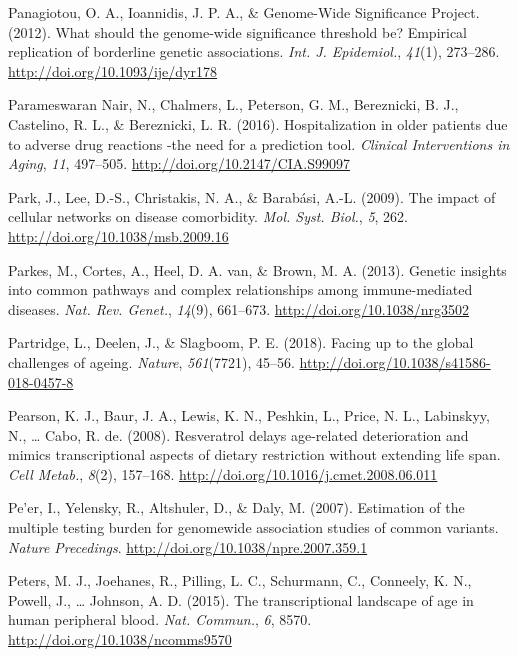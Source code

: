 \documentclass[12pt,twoside]{unicam}
\begin{document}
\begin{cslreferences}
\leavevmode\hypertarget{ref-Panagiotou2012}{}%
Panagiotou, O. A., Ioannidis, J. P. A., \& Genome-Wide Significance Project. (2012). What should the genome-wide significance threshold be? Empirical replication of borderline genetic associations. \emph{Int. J. Epidemiol.}, \emph{41}(1), 273--286. \url{http://doi.org/10.1093/ije/dyr178}

\leavevmode\hypertarget{ref-ParameswaranNair2016}{}%
Parameswaran Nair, N., Chalmers, L., Peterson, G. M., Bereznicki, B. J., Castelino, R. L., \& Bereznicki, L. R. (2016). Hospitalization in older patients due to adverse drug reactions -the need for a prediction tool. \emph{Clinical Interventions in Aging}, \emph{11}, 497--505. \url{http://doi.org/10.2147/CIA.S99097}

\leavevmode\hypertarget{ref-Park2009}{}%
Park, J., Lee, D.-S., Christakis, N. A., \& Barabási, A.-L. (2009). The impact of cellular networks on disease comorbidity. \emph{Mol. Syst. Biol.}, \emph{5}, 262. \url{http://doi.org/10.1038/msb.2009.16}

\leavevmode\hypertarget{ref-Parkes2013}{}%
Parkes, M., Cortes, A., Heel, D. A. van, \& Brown, M. A. (2013). Genetic insights into common pathways and complex relationships among immune-mediated diseases. \emph{Nat. Rev. Genet.}, \emph{14}(9), 661--673. \url{http://doi.org/10.1038/nrg3502}

\leavevmode\hypertarget{ref-Partridge2018}{}%
Partridge, L., Deelen, J., \& Slagboom, P. E. (2018). Facing up to the global challenges of ageing. \emph{Nature}, \emph{561}(7721), 45--56. \url{http://doi.org/10.1038/s41586-018-0457-8}

\leavevmode\hypertarget{ref-Pearson2008}{}%
Pearson, K. J., Baur, J. A., Lewis, K. N., Peshkin, L., Price, N. L., Labinskyy, N., \ldots{} Cabo, R. de. (2008). Resveratrol delays age-related deterioration and mimics transcriptional aspects of dietary restriction without extending life span. \emph{Cell Metab.}, \emph{8}(2), 157--168. \url{http://doi.org/10.1016/j.cmet.2008.06.011}

\leavevmode\hypertarget{ref-Peer2007}{}%
Pe'er, I., Yelensky, R., Altshuler, D., \& Daly, M. (2007). Estimation of the multiple testing burden for genomewide association studies of common variants. \emph{Nature Precedings}. \url{http://doi.org/10.1038/npre.2007.359.1}

\leavevmode\hypertarget{ref-Peters2015}{}%
Peters, M. J., Joehanes, R., Pilling, L. C., Schurmann, C., Conneely, K. N., Powell, J., \ldots{} Johnson, A. D. (2015). The transcriptional landscape of age in human peripheral blood. \emph{Nat. Commun.}, \emph{6}, 8570. \url{http://doi.org/10.1038/ncomms9570}


\end{cslreferences}
\end{document}
